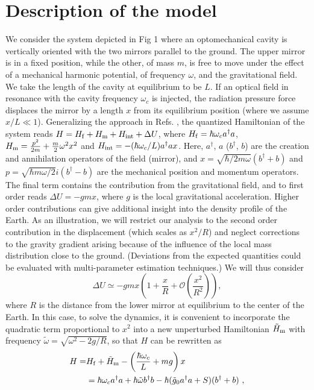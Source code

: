 \documentclass[aps,twocolumn,preprintnumbers,amsmath,amssymb]{revtex4}
\newcommand{\ad}{a^{\dag}}
\newcommand{\bd}{b^{\dag}}
\begin{document}
\section{\label{sec: Description of the model} Description of the model}
We consider the system depicted in Fig 1 where an optomechanical cavity is vertically oriented
with the two mirrors parallel to the ground. The upper mirror is in a fixed position, while the other, of mass $m$, is free to move
under the effect of a mechanical harmonic potential, of frequency $\omega$, and the gravitational field. We take the length of the cavity at equilibrium to be $L$.  If an optical field in resonance with the cavity frequency $\omega_c$ is injected, the radiation pressure force displaces the mirror by a length $x$ from its equilibrium position (where we assume $x/L \ll 1$). Generalizing the approach in Refs. \cite{Law1995, mancini1997}, the quantized Hamiltonian of the system reads $H=H_{\rm f}+H_{\rm m}+H_{\rm int}+\Delta U$, where $H_{\rm f}= \hbar \omega_c \ad a$, $H_{\rm m}= \frac{p^2}{2m}+\frac{m}{2}\omega^2x^2$ and $H_{\rm int}= -(\hbar\omega_c/L) \ad a x$. Here, $\ad$, $a$ ($\bd$, $b$) are the creation and annihilation operators of the field (mirror), and $x=\sqrt{\hbar/2m\omega}(\bd +b)$ and $p=\sqrt{\hbar m\omega/2}i(\bd-b)$ are the mechanical position and momentum operators. The final term contains the contribution from the gravitational field, and to first order reads $\Delta U = -gmx$, where $g$ is the local gravitational acceleration. Higher order contributions can give additional insight into the density profile of the Earth. As an illustration, we will restrict our analysis to the second order contribution in the displacement (which scales as $x^2/R$) and neglect corrections to the gravity gradient arising because of the influence of the local mass distribution close to the ground. (Deviations from the expected quantities could be evaluated with multi-parameter estimation techniques.) We will thus consider
\begin{equation}
\Delta U\simeq-gmx\left(1+\frac{x}{R}+\mathcal{O}\left(\frac{x^2}{R^2}\right)\right),
\label{Variation-Potential}
\end{equation}
where $R$ is the distance from the lower mirror at equilibrium to the center of the Earth.
In this case, to solve the dynamics, it is convenient to incorporate the quadratic term proportional to $x^2$ into a new unperturbed Hamiltonian $\tilde{H}_{\rm m}$ with frequency $\tilde{\omega}=\sqrt{\omega^2-2g/R}$, so that $H$ can be rewritten as
\begin{equation}\begin{split}\label{H-quantum}
H=&H_{\rm f}+\tilde{H}_{\rm m}-\left(\frac{\hbar\omega_c}{L}+mg\right)x\\
&=\hbar\omega_c \ad a+\hbar\tilde{\omega}\bd b-\hbar(\tilde{g}_0\ad a+S)(\bd+b)\ ,
\end{split}\end{equation}
\end{document}
